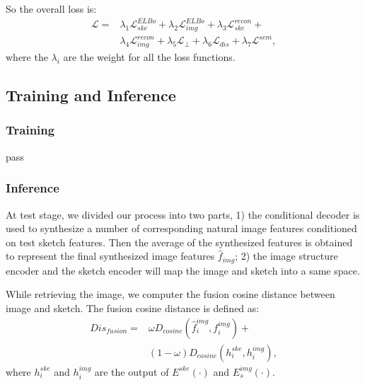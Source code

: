 \documentclass[10pt,twocolumn,letterpaper]{article}
\begin{document}
So the overall loss is:
\begin{align}
	\mathcal{L} =& \lambda_1 \mathcal{L}_{ske}^{ELBo} + \lambda_2 \mathcal{L}_{img}^{ELBo} + \lambda_3 \mathcal{L}_{ske}^{recon} + \\ &\lambda_4 \mathcal{L}_{img}^{recon} + \lambda_5 \mathcal{L}_{\perp} + \lambda_6 \mathcal{L}_{dis} + \lambda_7 \mathcal{L}^{sem}, 
\end{align}
where the $\lambda_i$ are the weight for all the loss functions.

\subsection{Training and Inference}

\subsubsection{Training}
pass

\subsubsection{Inference}
At test stage, we divided our process into two parts, 1) the conditional decoder is used to synthesize a number of corresponding natural image features conditioned on  test sketch features. Then the average of the synthesized features is obtained to represent the final synthesized image features $\hat{f}_{img}$; 2) the image structure encoder and the sketch encoder will map the image and sketch into a same space.

While retrieving the image, we computer the fusion cosine distance between image and sketch. The fusion cosine distance is defined as:
\begin{equation}
\begin{aligned}
	Dis_{fusion} =& \omega D_{cosine}(\hat{f}^{img}_i, f^{img}_{i}) +  \\
	& (1-\omega) D_{cosine}(h^{ske}_i, h^{img}_i), 
\end{aligned}
\end{equation}
where $h^{ske}_i$ and $h^{img}_i$ are the output of $E^{ske}(\cdot)$ and $E^{img}_{s}(\cdot)$.



\end{document}
